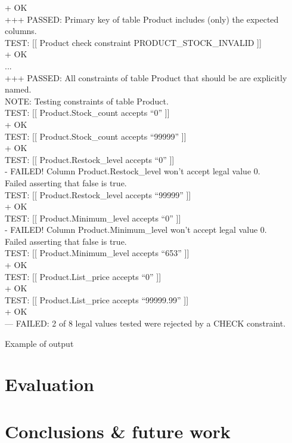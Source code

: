 \documentclass[sigconf, authordraft]{acmart}
\begin{document}
\begin{table}
\begin{tabbing}
        \>  + OK \\
        +++ PASSED: Primary key of table Product includes (only) the expected \\
        columns. \\
        TEST: [[ Product check constraint PRODUCT\_STOCK\_INVALID ]]  \\
        \>  + OK \\
        ... \\
        +++ PASSED: All constraints of table Product that should be are explicitly \\
        named. \\
        NOTE: Testing constraints of table Product. \\
        TEST: [[ Product.Stock\_count accepts “0” ]]  \\
        \>  + OK \\
        TEST: [[ Product.Stock\_count accepts “99999” ]]  \\
        \>  + OK \\
        TEST: [[ Product.Restock\_level accepts “0” ]]  \\
        \>  - FAILED! Column Product.Restock\_level won’t accept legal value 0. \\
        Failed asserting that false is true. \\
        TEST: [[ Product.Restock\_level accepts “99999” ]]  \\
        \>  + OK \\
        TEST: [[ Product.Minimum\_level accepts “0” ]]  \\
        \>  - FAILED! Column Product.Minimum\_level won’t accept legal value 0. \\
        Failed asserting that false is true. \\
        TEST: [[ Product.Minimum\_level accepts “653” ]]  \\
        \>  + OK \\
        TEST: [[ Product.List\_price accepts “0” ]]  \\
        \>  + OK \\
        TEST: [[ Product.List\_price accepts “99999.99” ]]  \\
        \>  + OK \\
        --- FAILED: 2 of 8 legal values tested were rejected by a CHECK constraint.
    \end{tabbing}
    \caption{Example of output}
\end{table}

\section{Evaluation}
\label{sec-evaluation}

\section{Conclusions \& future work}
\label{sec-conclusion}

\newpage


\end{document}
